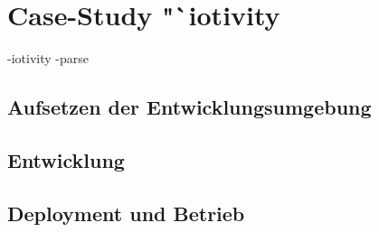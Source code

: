 \chapter{Case-Study "`iotivity}

-iotivity
-parse

\section{Aufsetzen der Entwicklungsumgebung}

\section{Entwicklung}

\section{Deployment und Betrieb}